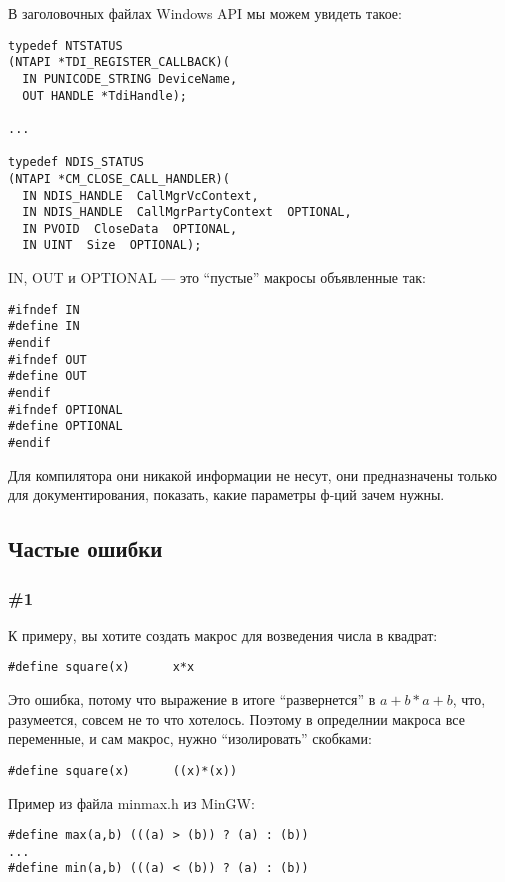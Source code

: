 В заголовочных файлах Windows API мы можем увидеть такое:

\begin{lstlisting}
typedef NTSTATUS
(NTAPI *TDI_REGISTER_CALLBACK)(
  IN PUNICODE_STRING DeviceName,
  OUT HANDLE *TdiHandle);

...

typedef NDIS_STATUS
(NTAPI *CM_CLOSE_CALL_HANDLER)(
  IN NDIS_HANDLE  CallMgrVcContext,
  IN NDIS_HANDLE  CallMgrPartyContext  OPTIONAL,
  IN PVOID  CloseData  OPTIONAL,
  IN UINT  Size  OPTIONAL);
\end{lstlisting}

IN, OUT и OPTIONAL --- это ``пустые'' макросы объявленные так:

\begin{lstlisting}
#ifndef IN
#define IN
#endif
#ifndef OUT
#define OUT
#endif
#ifndef OPTIONAL
#define OPTIONAL
#endif
\end{lstlisting}

Для компилятора они никакой информации не несут, они предназначены только для документирования, показать,
какие параметры ф-ций зачем нужны.

\subsection{Частые ошибки}

\subsubsection{\#1}

К примеру, вы хотите создать макрос для возведения числа в квадрат:

\begin{lstlisting}
#define square(x)      x*x
\end{lstlisting}

Это ошибка, потому что выражение  в итоге ``развернется'' в $a+b*a+b$, что, разумеется, совсем
не то что хотелось. Поэтому в определнии макроса все переменные, и сам макрос, нужно ``изолировать'' скобками:

\begin{lstlisting}
#define square(x)      ((x)*(x))
\end{lstlisting}

Пример из файла minmax.h из MinGW:

\begin{lstlisting}
#define max(a,b) (((a) > (b)) ? (a) : (b))
...
#define min(a,b) (((a) < (b)) ? (a) : (b))
\end{lstlisting}

